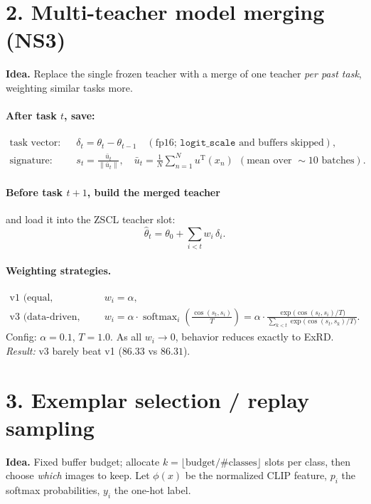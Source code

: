 \documentclass[11pt]{article}
\newcommand{\teach}{\mathrm{T}}
\newcommand{\softmax}{\operatorname{softmax}}
\begin{document}
\section*{2. Multi-teacher model merging (NS3)}

\textbf{Idea.} Replace the single frozen teacher with a merge of one teacher \emph{per past task},
weighting similar tasks more.

\paragraph{After task $t$, save:}
\begin{align}
\text{task vector:}\quad & \delta_t = \theta_t - \theta_{t-1} \quad (\text{fp16; } \texttt{logit\_scale} \text{ and buffers skipped}),\\
\text{signature:}\quad & s_t = \frac{\bar{u}_t}{\lVert \bar{u}_t\rVert}, \quad
\bar{u}_t = \frac{1}{N}\sum_{n=1}^{N} u^{\teach}(x_n) \ \ (\text{mean over } \sim 10 \text{ batches}).
\end{align}

\paragraph{Before task $t{+}1$, build the merged teacher} and load it into the ZSCL teacher slot:
\[
\hat{\theta}_t = \theta_0 + \sum_{i<t} w_i \, \delta_i .
\]

\paragraph{Weighting strategies.}
\begin{align}
\text{v1 (equal, ablation):}\quad & w_i = \alpha, \\
\text{v3 (data-driven, headline):}\quad & w_i = \alpha\cdot\softmax_i\!\left(\frac{\cos(s_t, s_i)}{T}\right)
= \alpha \cdot \frac{\exp\!\big(\cos(s_t,s_i)/T\big)}{\sum_{k<t}\exp\!\big(\cos(s_t,s_k)/T\big)} .
\end{align}
Config: $\alpha = 0.1$, $T = 1.0$. As all $w_i \to 0$, behavior reduces exactly to ExRD.
\emph{Result:} v3 barely beat v1 ($86.33$ vs $86.31$).

\section*{3. Exemplar selection / replay sampling}

\textbf{Idea.} Fixed buffer budget; allocate $k = \lfloor \text{budget}/\#\text{classes}\rfloor$ slots per class,
then choose \emph{which} images to keep. Let $\phi(x)$ be the normalized CLIP feature, $p_i$ the softmax
probabilities, $y_i$ the one-hot label.
\end{document}

